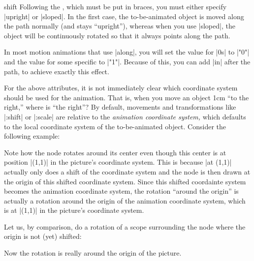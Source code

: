 \begin{tikzanimateattribute}{shift}
  Following the , which must be put in braces, you must
  either specify |upright| or |sloped|. In the first case, the
  to-be-animated object is moved along the path normally (and stays
  ``upright''), whereas when you use |sloped|, the object will be
  continuously rotated so that it always points along the path.
\begin{codeexample}[animation list={0.5,1,1.5,2}]
\end{codeexample}
  
  In most motion animations that use |along|, you will set the value
  for |0s| to |"0"| and the value for some specific  to
  |"1"|. Because of this, you can add |in|  after the path,
  to achieve exactly this effect.
\end{tikzanimateattribute}


For the above attributes, it is not immediately clear which coordinate
system should be used for the animation. That is, when you move an
object 1cm ``to the right,'' where is ``the right''? 
By default, movements and transformations like |:shift| or |:scale|
are relative to the \emph{animation coordinate system,} which defaults
to the local coordinate system of the to-be-animated object. Consider
the following example:
\begin{codeexample}[animation list={0.5,1,1.5,2}]
\end{codeexample}
Note how the node rotates around its center even though this center is
at position |(1,1)| in the picture's coordinate system. This is
because |at (1,1)| actually only does a shift of the coordinate system
and the node is then drawn at the origin of this shifted coordinate
system. Since this shifted coordainte system becomes the animation
coordinate system, the rotation ``around the origin'' is actually a
rotation around the origin of the animation coordinate system, which
is at |(1,1)| in the picture's coordinate system.

Let us, by comparison, do a rotation of a scope surrounding the node
where the origin is not (yet) shifted:
\begin{codeexample}[animation list={0.5,1,1.5,2}]
\end{codeexample}
Now the rotation is really around the origin of the picture.


